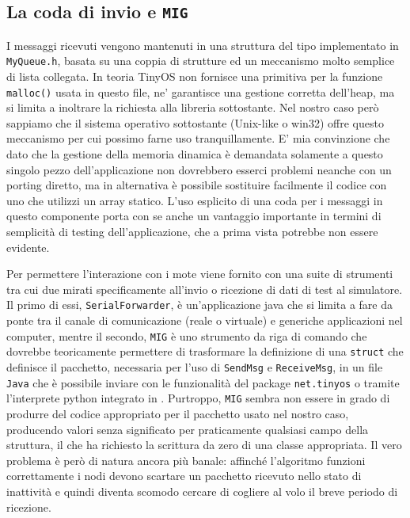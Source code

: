 \documentclass[twoside,11pt,a4paper,italian,openany]{book}
\begin{document}
\subsection{La coda di invio e \texttt{MIG}}
I messaggi ricevuti vengono mantenuti in una struttura del tipo implementato in
 \texttt{MyQueue.h}, 
basata su una coppia di strutture ed un meccanismo molto semplice di lista collegata. 
In teoria TinyOS non fornisce una primitiva per la funzione \texttt{malloc()} usata in questo 
file, ne' garantisce una gestione corretta dell'heap, ma si limita a inoltrare la richiesta 
alla libreria sottostante.  Nel nostro caso però sappiamo che il sistema operativo sottostante 
(Unix-like o win32) offre questo meccanismo per cui possimo farne uso tranquillamente. 
E' mia convinzione che dato che la gestione della memoria dinamica è demandata solamente a 
questo singolo pezzo dell'applicazione non dovrebbero esserci problemi neanche con un porting 
diretto, ma in alternativa è possibile sostituire facilmente il codice con uno che utilizzi un 
array statico. 
L'uso esplicito di una coda per i messaggi in questo componente porta con se anche un 
vantaggio importante in termini di semplicità di testing dell'applicazione, che a prima vista 
potrebbe non essere evidente. 

Per permettere l'interazione con i mote \tos viene fornito con una suite di strumenti tra cui due
mirati specificamente all'invio o ricezione di dati di test al simulatore. 
Il primo di essi, \texttt{SerialForwarder}, è un'applicazione java che si limita a fare da ponte 
tra il canale di comunicazione (reale o virtuale) e generiche applicazioni nel computer, mentre 
il secondo, \texttt{MIG} è uno strumento da riga di comando che dovrebbe teoricamente 
permettere di trasformare la definizione di una \texttt{struct} che definisce il pacchetto, 
necessaria per l'uso di \texttt{SendMsg} e \texttt{ReceiveMsg}, in un file \texttt{Java} che è 
possibile inviare con le funzionalità del package \texttt{net.tinyos} o tramite l'interprete 
python integrato in \tv. 
Purtroppo, \texttt{MIG} sembra non essere in grado di produrre del codice appropriato per il 
pacchetto usato nel nostro caso, producendo valori senza significato per praticamente qualsiasi 
campo della struttura, il che ha richiesto la scrittura da zero di una classe appropriata. 
Il vero problema è però di natura ancora più banale: affinché l'algoritmo funzioni correttamente 
i nodi devono scartare un pacchetto ricevuto nello stato di inattività e quindi diventa scomodo
cercare di cogliere al volo il breve periodo di ricezione. 
\end{document}
